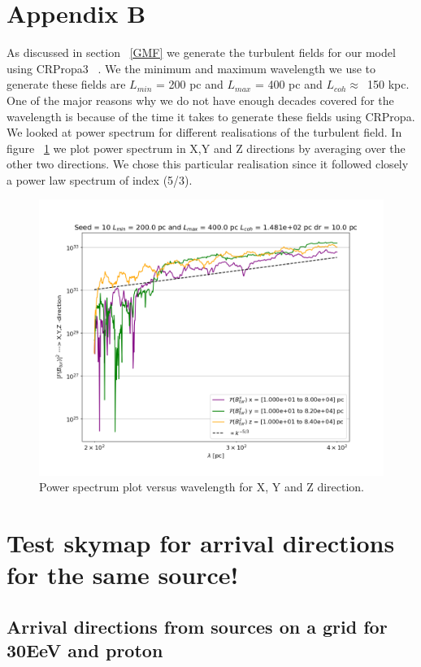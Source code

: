 \documentclass[12pt, a4 paper]{article}
\begin{document}
\section{Appendix B}\label{Appendix_B}
As discussed in section ~\ref{GMF} we generate the turbulent fields for our model using CRPropa3 ~\cite{CRPropa3_2016}. We the minimum and maximum wavelength we use to generate these fields are 
$L_{min}$ = 200 pc and $L_{max}$ = 400 pc and $L_{coh} \approx $~150 kpc. One of the major reasons why we do not have enough decades covered for the wavelength is because of the time it takes to generate these fields using CRPropa. 
We looked at power spectrum for different realisations of the turbulent field. In figure ~\ref{fig:PowerSpectrum} we plot power spectrum in X,Y and Z directions by averaging over the other two directions. We chose this particular realisation since it followed closely a power law spectrum of index (5/3). 
\begin{figure}[h!]
    \centering
    \includegraphics[width = 12cm]{Images/Jan3_Test_PowerSpectrum_vs_lambda_seed_10.png}
    \caption{Power spectrum plot versus wavelength for X, Y and Z direction.}
    \label{fig:PowerSpectrum}
\end{figure}
\section{Test skymap for arrival directions for the same source!}

\subsection{Arrival directions from sources on a grid for 30EeV and proton}
\end{document}
